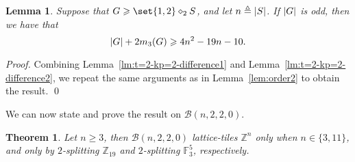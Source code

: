 \documentclass[sort&compress]{elsarticle}
\DeclarePairedDelimiter\abs{\lvert}{\rvert}
\newcommand{\cB}{\mathcal{B}}
\renewcommand{\geq}{\geqslant}
\newtheorem{theorem}{Theorem}
\newtheorem{lemma}{Lemma}
\newcommand{\F}{\mathbb{F}}
\newcommand{\Z}{\mathbb{Z}}
\newcommand{\eqdef}{\triangleq}
\newcommand{\splt}{\diamond}
\begin{document}
    \begin{lemma}\label{lem:order3}
      Suppose that $G \geq \set{1,2} \splt_2 S$, and let $n \eqdef
      \abs{S}$. If $\abs{G}$ is odd, then we have that
      \[\abs{G} +2m_3(G) \geq 4n^2 - 19n-10.\]
    \end{lemma}
    \begin{proof}
      Combining Lemma~\ref{lm:t=2-kp=2-difference1} and
      Lemma~\ref{lm:t=2-kp=2-difference2}, we repeat the same
      arguments as in Lemma~\ref{lem:order2} to obtain the result.
    \qed\end{proof}



    We can now state and prove the result on $\cB(n,2,2,0)$.
    \begin{theorem}
      \label{th:no220}
      Let $n \geq 3$, then $\cB(n,2,2,0)$ lattice-tiles $\Z^n$ only
      when $n\in\{3,11\}$, and only by $2$-splitting $\Z_{19}$ and
      $2$-splitting $\F_3^{5}$, respectively.
    \end{theorem}
\end{document}
